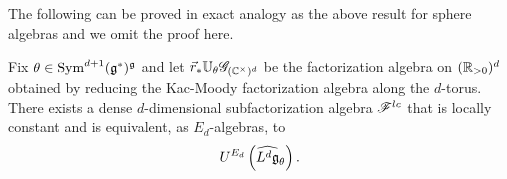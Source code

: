 The following can be proved in exact analogy as the above result for sphere algebras and we omit the proof here.

\begin{prop}
Fix $\theta \in {\rm Sym}^{d+1}(\mathfrak g^*)^\mathfrak g$ and let $\vec{r}_* \mathbb U_\theta \mathscr G_{(\mathbb C^\times)^d}$ be the factorization algebra on $(\mathbb R_{>0})^d$ obtained by reducing the Kac-Moody factorization algebra along the $d$-torus.
There exists a dense $d$-dimensional subfactorization algebra $\mathscr F^{lc}$ that is locally constant and is equivalent, as $E_d$-algebras, to
\[
U^{E_d} \left( \widehat{L^d \mathfrak g}_{\theta} \right) .
\]
\end{prop}






